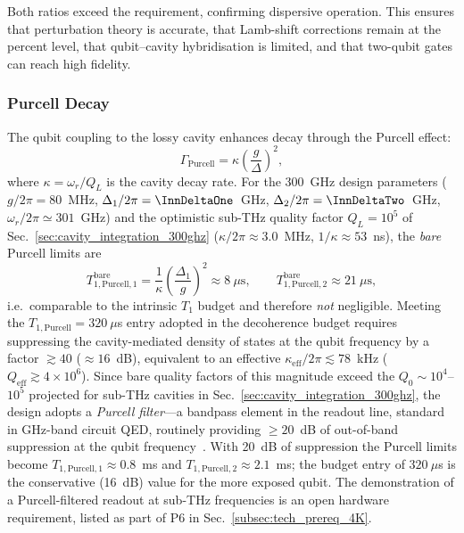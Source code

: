 Both ratios exceed the requirement, confirming dispersive operation. This ensures that perturbation theory is accurate, that Lamb-shift corrections remain at the percent level, that qubit--cavity hybridisation is limited, and that two-qubit gates can reach high fidelity.

\subsubsection{Purcell Decay}
\label{sec:purcell}

The qubit coupling to the lossy cavity enhances decay through the Purcell effect:
\begin{equation}
\Gamma_{\text{Purcell}} = \kappa \left(\frac{g}{\Delta}\right)^{2},
\label{eq:purcell_rate}
\end{equation}
where $\kappa = \omega_r/Q_L$ is the cavity decay rate. For the 300~GHz
design parameters ($g/2\pi = 80$~MHz, $\Delta_1/2\pi = \InnDeltaOne$~GHz,
$\Delta_2/2\pi = \InnDeltaTwo$~GHz, $\omega_r/2\pi \simeq 301$~GHz) and the
optimistic sub-THz quality factor $Q_L = 10^5$ of
Sec.~\ref{sec:cavity_integration_300ghz} ($\kappa/2\pi \approx 3.0$~MHz,
$1/\kappa \approx 53$~ns), the \emph{bare} Purcell limits are
\begin{equation}
T_{1,\text{Purcell},1}^{\text{bare}} = \frac{1}{\kappa}\left(\frac{\Delta_1}{g}\right)^{2}
\approx 8~\mu\text{s},
\qquad
T_{1,\text{Purcell},2}^{\text{bare}} \approx 21~\mu\text{s},
\end{equation}
i.e.\ comparable to the intrinsic $T_1$ budget and therefore \emph{not}
negligible. Meeting the $T_{1,\text{Purcell}} = 320~\mu$s entry adopted in
the decoherence budget requires suppressing the cavity-mediated density of
states at the qubit frequency by a factor $\gtrsim 40$ ($\approx 16$~dB),
equivalent to an effective $\kappa_{\text{eff}}/2\pi \lesssim 78$~kHz
($Q_{\text{eff}} \gtrsim 4\times10^{6}$). Since bare quality factors of
this magnitude exceed the $Q_0 \sim 10^4$--$10^5$ projected for sub-THz
cavities in Sec.~\ref{sec:cavity_integration_300ghz}, the design adopts a
\emph{Purcell filter}---a bandpass element in the readout line, standard in
GHz-band circuit QED, routinely providing $\geq 20$~dB of out-of-band
suppression at the qubit frequency~\cite{blais2021circuit}. With 20~dB of
suppression the Purcell limits become
$T_{1,\text{Purcell},1} \approx 0.8$~ms and
$T_{1,\text{Purcell},2} \approx 2.1$~ms; the budget entry of $320~\mu$s is
the conservative (16~dB) value for the more exposed qubit. The demonstration
of a Purcell-filtered readout at sub-THz frequencies is an open hardware
requirement, listed as part of P6 in Sec.~\ref{subsec:tech_prereq_4K}.

